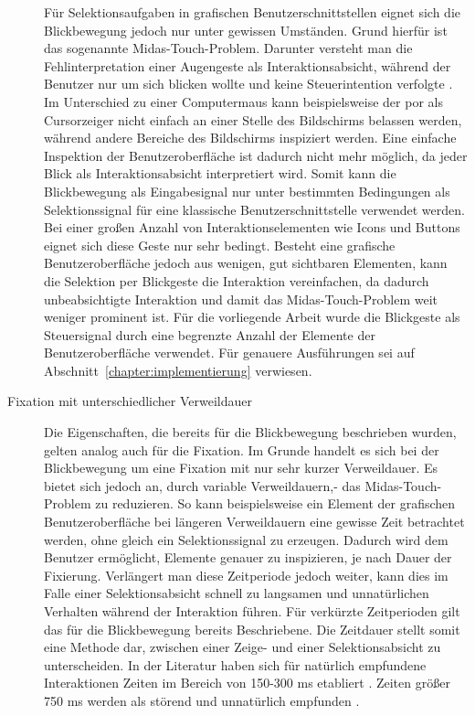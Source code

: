 \begin{description}
Für Selektionsaufgaben in grafischen Benutzerschnittstellen eignet sich die Blickbewegung jedoch nur unter gewissen Umständen. Grund hierfür ist das sogenannte Midas-Touch-Problem. Darunter versteht man die Fehlinterpretation einer Augengeste als Interaktionsabsicht, während der Benutzer nur um sich blicken wollte und keine Steuerintention verfolgte \cite{Majaranta2014,majaranta2011}. Im Unterschied zu einer Computermaus kann beispielsweise der \acs{por} als Cursorzeiger nicht einfach an einer Stelle des Bildschirms belassen werden, während andere Bereiche des Bildschirms inspiziert werden. Eine einfache Inspektion der Benutzeroberfläche ist dadurch nicht mehr möglich, da jeder Blick als Interaktionsabsicht interpretiert wird. Somit kann die Blickbewegung als Eingabesignal nur unter bestimmten Bedingungen als Selektionssignal für eine klassische Benutzerschnittstelle verwendet werden. Bei einer großen Anzahl von Interaktionselementen wie Icons und Buttons eignet sich diese Geste nur sehr bedingt. Besteht eine grafische Benutzeroberfläche jedoch aus wenigen, gut sichtbaren Elementen, kann die Selektion per Blickgeste die Interaktion vereinfachen, da dadurch unbeabsichtigte Interaktion und damit das Midas-Touch-Problem weit weniger prominent ist. Für die vorliegende Arbeit wurde die Blickgeste als Steuersignal durch eine begrenzte Anzahl der Elemente der Benutzeroberfläche verwendet. Für genauere Ausführungen sei auf Abschnitt~\ref{chapter:implementierung} verwiesen.
\item[Fixation mit unterschiedlicher Verweildauer] Die Eigenschaften, die bereits für die Blickbewegung beschrieben wurden, gelten analog auch für die Fixation. Im Grunde handelt es sich bei der Blickbewegung um eine Fixation mit nur sehr kurzer Verweildauer. Es bietet sich jedoch an, durch variable Verweildauern,- das \og Midas-Touch-Problem zu reduzieren. So kann beispielsweise ein Element der grafischen Benutzeroberfläche bei längeren Verweildauern eine gewisse Zeit betrachtet werden, ohne gleich ein Selektionssignal zu erzeugen. Dadurch wird dem Benutzer ermöglicht, Elemente genauer zu inspizieren, je nach Dauer der Fixierung. Verlängert man diese Zeitperiode jedoch weiter, kann dies im Falle einer Selektionsabsicht schnell zu langsamen und unnatürlichen Verhalten während der Interaktion führen. Für verkürzte Zeitperioden gilt das für die Blickbewegung bereits Beschriebene. Die Zeitdauer stellt somit eine Methode dar, zwischen einer Zeige- und einer Selektionsabsicht zu unterscheiden. In der Literatur haben sich für natürlich empfundene Interaktionen Zeiten im Bereich von 150-300 ms etabliert \cite{Hollomon2017,Eidam2015,majaranta2011}. Zeiten größer 750 ms werden als störend und unnatürlich empfunden \cite{Hollomon2017}. 

\end{description}
